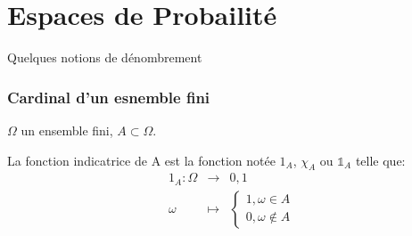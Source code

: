\part{Espaces de Probailité}
  Quelques notions de dénombrement
  \section{Cardinal d'un esnemble fini}
  $\Omega$ un ensemble fini, $A\subset\Omega$.
  \begin{definition}
    La fonction indicatrice de A est la fonction notée $1_A$, $\chi_A$ ou
    $\mathbb{1}_A$ telle que:
    \begin{eqnarray*}
      1_A : \Omega &\rightarrow& {0, 1}\\
            \omega &\mapsto& \begin{cases}
                            1, \omega\in A\\
                            0, \omega\notin A
                          \end{cases}
    \end{eqnarray*}
  \end{definition}
